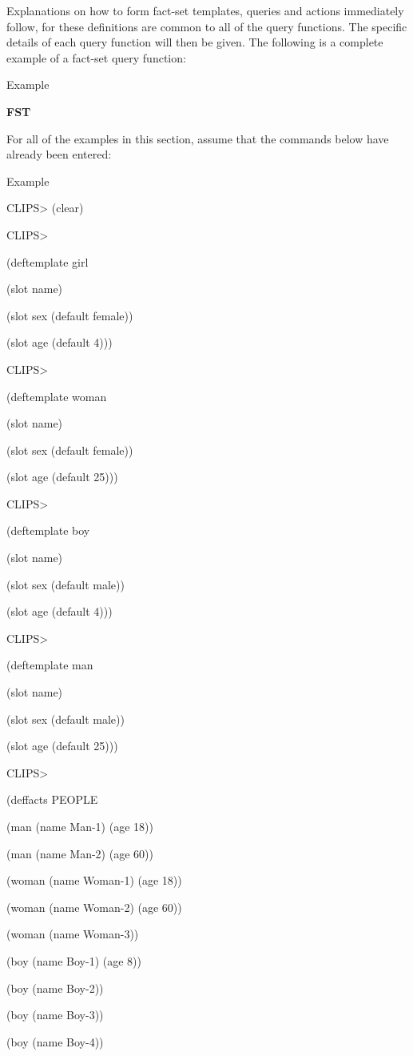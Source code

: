 \documentclass[letterpaper,10pt,english]{sphinxmanual}
\begin{document}
Explanations on how to form fact-set templates, queries and actions
immediately follow, for these definitions are common to all of the query
functions. The specific details of each query function will then be
given. The following is a complete example of a fact-set query function:

Example

{\color{red}\bfseries{}\textbar{}FST\textbar{}}

For all of the examples in this section, assume that the commands below
have already been entered:

Example

CLIPS\textgreater{} (clear)

CLIPS\textgreater{}

(deftemplate girl

(slot name)

(slot sex (default female))

(slot age (default 4)))

CLIPS\textgreater{}

(deftemplate woman

(slot name)

(slot sex (default female))

(slot age (default 25)))

CLIPS\textgreater{}

(deftemplate boy

(slot name)

(slot sex (default male))

(slot age (default 4)))

CLIPS\textgreater{}

(deftemplate man

(slot name)

(slot sex (default male))

(slot age (default 25)))

CLIPS\textgreater{}

(deffacts PEOPLE

(man (name Man-1) (age 18))

(man (name Man-2) (age 60))

(woman (name Woman-1) (age 18))

(woman (name Woman-2) (age 60))

(woman (name Woman-3))

(boy (name Boy-1) (age 8))

(boy (name Boy-2))

(boy (name Boy-3))

(boy (name Boy-4))
\end{document}
